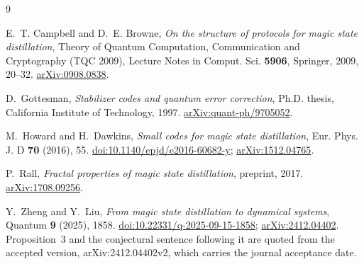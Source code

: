 \documentclass[11pt]{amsart}
\theoremstyle{remark}
\theoremstyle{definition}
\begin{document}
\begin{thebibliography}{9}

E.~T. Campbell and D.~E. Browne,
\emph{On the structure of protocols for magic state distillation},
Theory of Quantum Computation, Communication and Cryptography (TQC 2009),
Lecture Notes in Comput. Sci. \textbf{5906}, Springer, 2009, 20--32.
\href{https://arxiv.org/abs/0908.0838}{arXiv:0908.0838}.

D.~Gottesman,
\emph{Stabilizer codes and quantum error correction},
Ph.D. thesis, California Institute of Technology, 1997.
\href{https://arxiv.org/abs/quant-ph/9705052}{arXiv:quant-ph/9705052}.

M.~Howard and H.~Dawkins,
\emph{Small codes for magic state distillation},
Eur. Phys. J. D \textbf{70} (2016), 55.
\href{https://doi.org/10.1140/epjd/e2016-60682-y}{doi:10.1140/epjd/e2016-60682-y};
\href{https://arxiv.org/abs/1512.04765}{arXiv:1512.04765}.

P.~Rall,
\emph{Fractal properties of magic state distillation},
preprint, 2017.
\href{https://arxiv.org/abs/1708.09256}{arXiv:1708.09256}.

Y.~Zheng and Y.~Liu,
\emph{From magic state distillation to dynamical systems},
Quantum \textbf{9} (2025), 1858.
\href{https://doi.org/10.22331/q-2025-09-15-1858}{doi:10.22331/q-2025-09-15-1858};
\href{https://arxiv.org/abs/2412.04402}{arXiv:2412.04402}. Proposition~3 and the conjectural
sentence following it are quoted from the accepted version, arXiv:2412.04402v2, which carries the
journal acceptance date.

\end{thebibliography}
\end{document}
